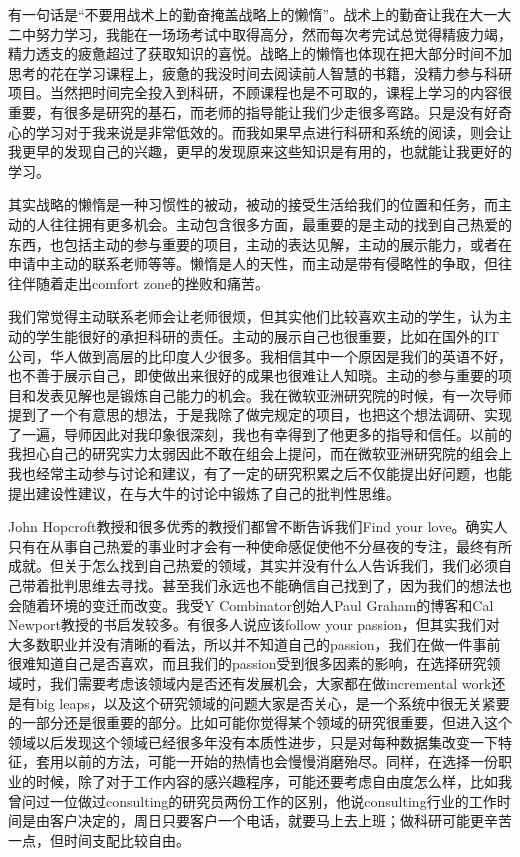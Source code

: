 \documentclass{vivid_layout}
\begin{document}
有一句话是“不要用战术上的勤奋掩盖战略上的懒惰”。战术上的勤奋让我在大一大二中努力学习，我能在一场场考试中取得高分，然而每次考完试总觉得精疲力竭，精力透支的疲惫超过了获取知识的喜悦。战略上的懒惰也体现在把大部分时间不加思考的花在学习课程上，疲惫的我没时间去阅读前人智慧的书籍，没精力参与科研项目。当然把时间完全投入到科研，不顾课程也是不可取的，课程上学习的内容很重要，有很多是研究的基石，而老师的指导能让我们少走很多弯路。只是没有好奇心的学习对于我来说是非常低效的。而我如果早点进行科研和系统的阅读，则会让我更早的发现自己的兴趣，更早的发现原来这些知识是有用的，也就能让我更好的学习。

其实战略的懒惰是一种习惯性的被动，被动的接受生活给我们的位置和任务，而主动的人往往拥有更多机会。主动包含很多方面，最重要的是主动的找到自己热爱的东西，也包括主动的参与重要的项目，主动的表达见解，主动的展示能力，或者在申请中主动的联系老师等等。懒惰是人的天性，而主动是带有侵略性的争取，但往往伴随着走出comfort zone的挫败和痛苦。

我们常觉得主动联系老师会让老师很烦，但其实他们比较喜欢主动的学生，认为主动的学生能很好的承担科研的责任。主动的展示自己也很重要，比如在国外的IT公司，华人做到高层的比印度人少很多。我相信其中一个原因是我们的英语不好，也不善于展示自己，即使做出来很好的成果也很难让人知晓。主动的参与重要的项目和发表见解也是锻炼自己能力的机会。我在微软亚洲研究院的时候，有一次导师提到了一个有意思的想法，于是我除了做完规定的项目，也把这个想法调研、实现了一遍，导师因此对我印象很深刻，我也有幸得到了他更多的指导和信任。以前的我担心自己的研究实力太弱因此不敢在组会上提问，而在微软亚洲研究院的组会上我也经常主动参与讨论和建议，有了一定的研究积累之后不仅能提出好问题，也能提出建设性建议，在与大牛的讨论中锻炼了自己的批判性思维。

John Hopcroft教授和很多优秀的教授们都曾不断告诉我们Find your love。确实人只有在从事自己热爱的事业时才会有一种使命感促使他不分昼夜的专注，最终有所成就。但关于怎么找到自己热爱的领域，其实并没有什么人告诉我们，我们必须自己带着批判思维去寻找。甚至我们永远也不能确信自己找到了，因为我们的想法也会随着环境的变迁而改变。我受Y Combinator创始人Paul Graham的博客和Cal Newport教授的书启发较多。有很多人说应该follow your passion，但其实我们对大多数职业并没有清晰的看法，所以并不知道自己的passion，我们在做一件事前很难知道自己是否喜欢，而且我们的passion受到很多因素的影响，在选择研究领域时，我们需要考虑该领域内是否还有发展机会，大家都在做incremental work还是有big leaps，以及这个研究领域的问题大家是否关心，是一个系统中很无关紧要的一部分还是很重要的部分。比如可能你觉得某个领域的研究很重要，但进入这个领域以后发现这个领域已经很多年没有本质性进步，只是对每种数据集改变一下特征，套用以前的方法，可能一开始的热情也会慢慢消磨殆尽。同样，在选择一份职业的时候，除了对于工作内容的感兴趣程序，可能还要考虑自由度怎么样，比如我曾问过一位做过consulting的研究员两份工作的区别，他说consulting行业的工作时间是由客户决定的，周日只要客户一个电话，就要马上去上班；做科研可能更辛苦一点，但时间支配比较自由。
\end{document}
